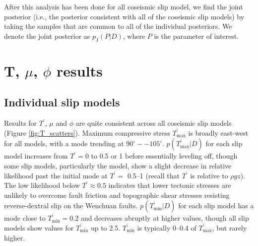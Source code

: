 \documentclass[twocolumn,jgrga]{AGUTeX}
\begin{document}
\begin{article}
After this analysis has been done for all coseismic slip model, we find
the joint posterior (i.e., the posterior consistent with all of the
coseismic slip models) by taking the samples that are common to all of
the individual posteriors. We denote the joint posterior as
$p_{\mathrm{J}}(P | D)$, where $P$ is the parameter of interest.

\section{T, $\mu$, $\phi$ results}\label{t-mu-phi-results}

\subsection{Individual slip models}\label{individual-slip-models}

Results for $T^\prime$, $\mu$ and $\phi$ are quite consistent across all
coseismic slip models (Figure \ref{fig:T_scatters}). Maximum compressive
stress $T^\prime_{\mathrm{max}}$ is broadly east-west for all models,
with a mode trending at $90^{\circ} -- 105^{\circ}$.
$p(T^\prime_{\mathrm{max}}|D)$ for each slip model increases from
$T^\prime = 0$ to 0.5 or 1 before essentially leveling off, though some
slip models, particularly the \citet{qi2011} model, show a
slight decrease in relative likelihood past the initial mode at
$T^\prime =$ 0.5--1 (recall that $T^\prime$ is relative to $\rho g z$).
The low likelihood below $T^\prime \approx 0.5$ indicates that lower
tectonic stresses are unlikely to overcome fault friction and
topographic shear stresses resisting reverse-dextral slip on the
Wenchuan faults. $p(T^\prime_{\mathrm{min}} | D)$ for each slip model
has a mode close to $T^\prime_{\mathrm{min}} = 0.2 $ and decreases
abruptly at higher values, though all slip models show values for
$T^\prime_{\mathrm{min}}$ up to 2.5. $T^\prime_{\mathrm{min}}$ is
typically 0--0.4 of $T^\prime_{\mathrm{max}}$, but rarely higher.


\end{article}
\end{document}

